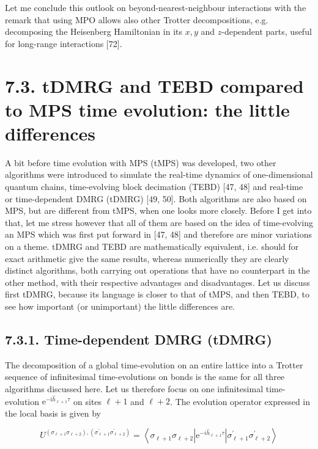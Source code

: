 \documentclass[12pt]{article}
\begin{document}
Let me conclude this outlook on beyond-nearest-neighbour interactions with the remark that using MPO allows also other Trotter decompositions, e.g. decomposing the Heisenberg Hamiltonian in its $x, y$ and $z$-dependent parts, useful for long-range interactions [72].

\section*{7.3. tDMRG and TEBD compared to MPS time evolution: the little differences}
A bit before time evolution with MPS (tMPS) was developed, two other algorithms were introduced to simulate the real-time dynamics of one-dimensional quantum chains, time-evolving block decimation (TEBD) [47, 48] and real-time or time-dependent DMRG (tDMRG) [49, 50]. Both algorithms are also based on MPS, but are different from tMPS, when one looks more closely. Before I get into that, let me stress however that all of them are based on the idea of time-evolving an MPS which was first put forward in [47, 48] and therefore are minor variations on a theme. tDMRG and TEBD are mathematically equivalent, i.e. should for exact arithmetic give the same results, whereas numerically they are clearly distinct algorithms, both carrying out operations that have no counterpart in the other method, with their respective advantages and disadvantages. Let us discuss first tDMRG, because its language is closer to that of tMPS, and then TEBD, to see how important (or unimportant) the little differences are.

\subsection*{7.3.1. Time-dependent DMRG (tDMRG)}
The decomposition of a global time-evolution on an entire lattice into a Trotter sequence of infinitesimal time-evolutions on bonds is the same for all three algorithms discussed here. Let us therefore focus on one infinitesimal time-evolution $\mathrm{e}^{-\mathrm{i} \hat{h}_{\ell+1} \tau}$ on sites $\ell+1$ and $\ell+2$. The evolution operator expressed in the local basis is given by


\begin{equation*}
U^{\left(\sigma_{\ell+1} \sigma_{\ell+2}\right),\left(\sigma_{\ell+1}^{\prime} \sigma_{\ell+2}^{\prime}\right)}=\left\langle\sigma_{\ell+1} \sigma_{\ell+2}\left|\mathrm{e}^{-i \hat{h}_{\ell+1} \tau}\right| \sigma_{\ell+1}^{\prime} \sigma_{\ell+2}^{\prime}\right\rangle \tag{254}
\end{equation*}
\end{document}
